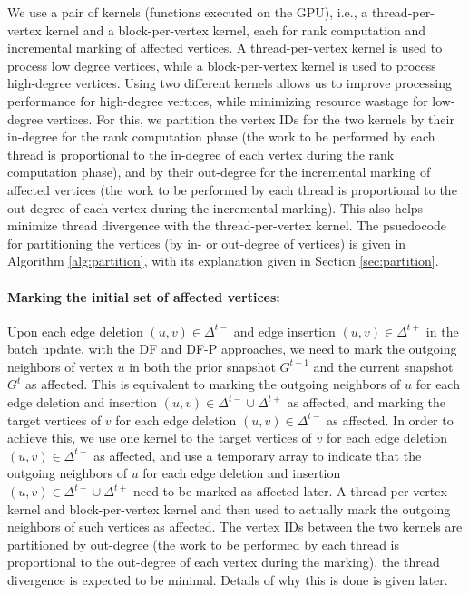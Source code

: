 We use a pair of kernels (functions executed on the GPU), i.e., a thread-per-vertex kernel and a block-per-vertex kernel, each for rank computation and incremental marking of affected vertices. A thread-per-vertex kernel is used to process low degree vertices, while a block-per-vertex kernel is used to process high-degree vertices. Using two different kernels allows us to improve processing performance for high-degree vertices, while minimizing resource wastage for low-degree vertices. For this, we partition the vertex IDs for the two kernels by their in-degree for the rank computation phase (the work to be performed by each thread is proportional to the in-degree of each vertex during the rank computation phase), and by their out-degree for the incremental marking of affected vertices (the work to be performed by each thread is proportional to the out-degree of each vertex during the incremental marking). This also helps minimize thread divergence with the thread-per-vertex kernel. The psuedocode for partitioning the vertices (by in- or out-degree of vertices) is given in Algorithm \ref{alg:partition}, with its explanation given in Section \ref{sec:partition}.

\paragraph{Marking the initial set of affected vertices:}

Upon each edge deletion $(u, v) \in \Delta^{t-}$ and edge insertion $(u, v) \in \Delta^{t+}$ in the batch update, with the DF and DF-P approaches, we need to mark the outgoing neighbors of vertex $u$ in both the prior snapshot $G^{t-1}$ and the current snapshot $G^t$ as affected. This is equivalent to marking the outgoing neighbors of $u$ for each edge deletion and insertion $(u, v) \in \Delta^{t-} \cup\Delta^{t+}$ as affected, and marking the target vertices of $v$ for each edge deletion $(u, v) \in \Delta^{t-}$ as affected. In order to achieve this, we use one kernel to the target vertices of $v$ for each edge deletion $(u, v) \in \Delta^{t-}$ as affected, and use a temporary array to indicate that the outgoing neighbors of $u$ for each edge deletion and insertion $(u, v) \in \Delta^{t-} \cup\Delta^{t+}$ need to be marked as affected later. A thread-per-vertex kernel and block-per-vertex kernel and then used to actually mark the outgoing neighbors of such vertices as affected. The vertex IDs between the two kernels are partitioned by out-degree (the work to be performed by each thread is proportional to the out-degree of each vertex during the marking), the thread divergence is expected to be minimal. Details of why this is done is given later.

